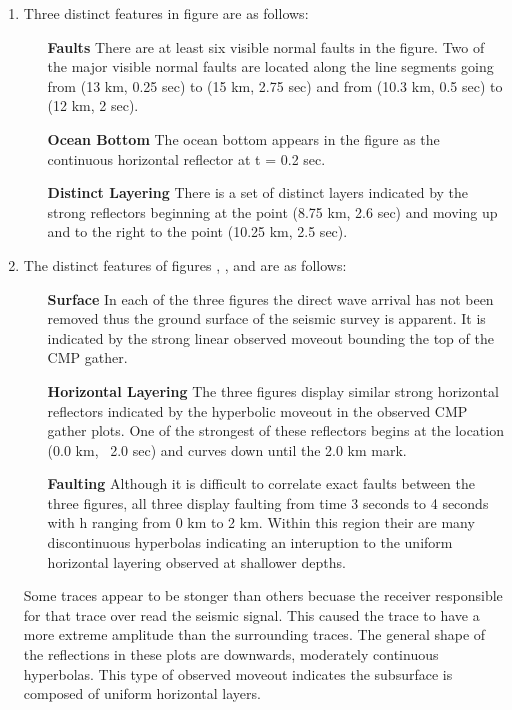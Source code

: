 \begin{enumerate}


  \item Three distinct features in figure  are as follows:
  \begin{itemize}
    \item[\textbf{Faults}] There are at least six visible normal faults in the figure. Two of the major visible normal faults are located along the line segments going from (13 km, 0.25 sec) to (15 km, 2.75 sec) and from (10.3 km, 0.5 sec) to (12 km, 2 sec).
    \item[\textbf{Ocean Bottom}] The ocean bottom appears in the figure as the continuous horizontal reflector at t = 0.2 sec.
    \item[\textbf{Distinct Layering}] There is a set of distinct layers indicated by the strong reflectors beginning at the point (8.75 km, 2.6 sec) and moving up and to the right to the point (10.25 km, 2.5 sec). 
  \end{itemize}



  \item The distinct features of figures , , and  are as follows:
  \begin{itemize}
    \item[\textbf{Surface}] In each of the three figures the direct wave arrival has not been removed thus the ground surface of the seismic survey is apparent. It is indicated by the strong linear observed moveout bounding the top of the CMP gather.
    \item[\textbf{Horizontal Layering}] The three figures display similar strong horizontal reflectors indicated by the hyperbolic moveout in the observed CMP gather plots. One of the strongest of these reflectors begins at the location (0.0 km, ~2.0 sec) and curves down until the 2.0 km mark.
    \item[\textbf{Faulting}] Although it is difficult to correlate exact faults between the three figures, all three display faulting from time 3 seconds to 4 seconds with h ranging from 0 km to 2 km. Within this region their are many discontinuous hyperbolas indicating an interuption to the uniform horizontal layering observed at shallower depths.  
  \end{itemize} Some traces appear to be stonger than others becuase the receiver responsible for that trace over read the seismic signal. This caused the trace to have a more extreme amplitude than the surrounding traces. The general shape of the reflections in these plots are downwards, moderately continuous hyperbolas. This type of observed moveout indicates the subsurface is composed of uniform horizontal layers.



\end{enumerate}

